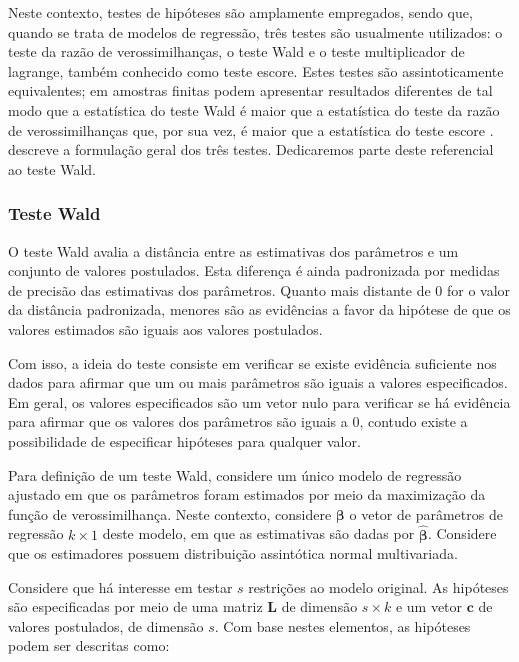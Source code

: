 Neste contexto, testes de hipóteses são amplamente empregados, sendo que, quando se trata de modelos de regressão, três testes são usualmente utilizados: o teste da razão de verossimilhanças, o teste Wald e o teste multiplicador de lagrange, também conhecido como teste escore. Estes testes são assintoticamente equivalentes; em amostras finitas podem apresentar resultados diferentes de tal modo que a estatística do teste Wald é maior que a estatística do teste da razão de verossimilhanças que, por sua vez, é maior que a estatística do teste escore \citep{conflict}. \citet{engle} descreve a formulação geral dos três testes. Dedicaremos parte deste referencial ao teste Wald.

\subsubsection{Teste Wald}

O teste Wald \citep{wald} avalia a distância entre as estimativas dos parâmetros e um conjunto de valores postulados. Esta diferença é ainda padronizada por medidas de precisão das estimativas dos parâmetros. Quanto mais distante de 0 for o valor da distância padronizada, menores são as evidências a favor da hipótese de que os valores estimados são iguais aos valores postulados.

Com isso, a ideia do teste consiste em verificar se existe evidência suficiente nos dados para afirmar que um ou mais parâmetros são iguais a valores especificados. Em geral, os valores especificados são um vetor nulo para verificar se há evidência para afirmar que os valores dos parâmetros são iguais a 0, contudo existe a possibilidade de especificar hipóteses para qualquer valor.

Para definição de um teste Wald, considere um único modelo de regressão ajustado em que os parâmetros foram estimados por meio da maximização da função de verossimilhança. Neste contexto, considere $\boldsymbol{\beta}$ o vetor de parâmetros de regressão $k \times 1$ deste modelo, em que as estimativas são dadas por $\boldsymbol{\hat\beta}$. Considere que os estimadores possuem distribuição assintótica normal multivariada.

Considere que há interesse em testar $s$ restrições ao modelo original. As hipóteses são especificadas por meio de uma matriz $\boldsymbol{L}$ de dimensão $s \times k$ e um vetor $\boldsymbol{c}$ de valores postulados, de dimensão $s$. Com base nestes elementos, as hipóteses podem ser descritas como:

